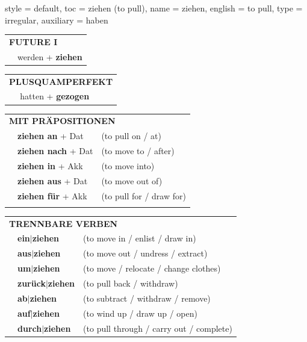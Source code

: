 \begin{verbentry}{
  style = {default},
  toc = {ziehen (to pull)},
  name = {ziehen},
  english = {to pull},
  type = {irregular},
  auxiliary = {haben}
}
\begin{tabular}{rl}
    \multicolumn{2}{l}{\textbf{FUTURE I} }\\
  &  werden + \textbf{ziehen}\\
 
  \end{tabular}
\hfill
   \begin{tabular}{rl}
      \multicolumn{2}{l}{\textbf{PLUSQUAMPERFEKT}}\\
  &  hatten + \textbf{gezogen}
  \end{tabular}
  


  \vspace{10pt}

   \begin{tabular}{lll}
      \multicolumn{3}{l}{\textbf{MIT PRÄPOSITIONEN}}\\
& \textbf{ziehen an} + Dat & (to pull on / at)\\
& \textbf{ziehen nach} + Dat & (to move to / after)\\
& \textbf{ziehen in} + Akk & (to move into)\\
& \textbf{ziehen aus} + Dat & (to move out of)\\
& \textbf{ziehen für} + Akk & (to pull for / draw for)\\
\vspace{10pt}
  \end{tabular}
  \hfill
   \begin{tabular}{lll}
      \multicolumn{3}{l}{\textbf{TRENNBARE VERBEN}}\\
 & \textbf{ein$|$ziehen} & (to move in / enlist / draw in)\\
 & \textbf{aus$|$ziehen} & (to move out / undress / extract)\\
 & \textbf{um$|$ziehen} & (to move / relocate / change clothes)\\
 & \textbf{zurück$|$ziehen} & (to pull back / withdraw)\\
 & \textbf{ab$|$ziehen} & (to subtract / withdraw / remove)\\
 & \textbf{auf$|$ziehen} & (to wind up / draw up / open)\\
 & \textbf{durch$|$ziehen} & (to pull through / carry out / complete)
  \end{tabular}


  \vspace{-5pt}
\end{verbentry}
